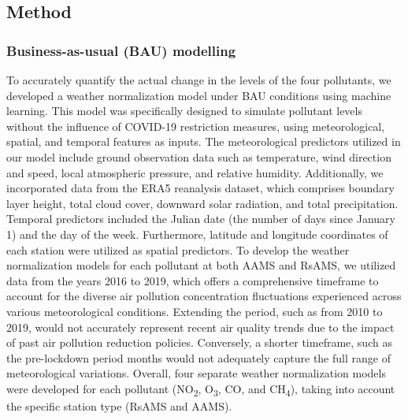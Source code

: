 \subsection{Method} \label{chap4_method}
\subsubsection{Business-as-usual (BAU) modelling}
To accurately quantify the actual change in the levels of the four pollutants, we developed a weather normalization model under BAU conditions using machine learning. This model was specifically designed to simulate pollutant levels without the influence of COVID-19 restriction measures, using meteorological, spatial, and temporal features as inputs. The meteorological predictors utilized in our model include ground observation data such as temperature, wind direction and speed, local atmospheric pressure, and relative humidity. Additionally, we incorporated data from the ERA5 reanalysis dataset, which comprises boundary layer height, total cloud cover, downward solar radiation, and total precipitation. Temporal predictors included the Julian date (the number of days since January 1) and the day of the week. Furthermore, latitude and longitude coordinates of each station were utilized as spatial predictors. To develop the weather normalization models for each pollutant at both AAMS and RsAMS, we utilized data from the years 2016 to 2019, which offers a comprehensive timeframe to account for the diverse air pollution concentration fluctuations experienced across various meteorological conditions. Extending the period, such as from 2010 to 2019, would not accurately represent recent air quality trends due to the impact of past air pollution reduction policies. Conversely, a shorter timeframe, such as the pre-lockdown period months would not adequately capture the full range of meteorological variations. Overall, four separate weather normalization models were developed for each pollutant (NO\textsubscript{2}, O\textsubscript{3}, CO, and CH\textsubscript{4}), taking into account the specific station type (RsAMS and AAMS). \par

